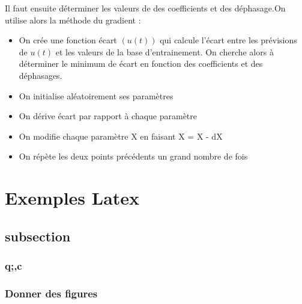 \documentclass[11pt,a4paper]{article}
\begin{document}
Il faut ensuite déterminer les valeurs de des coefficients et des déphasage.On utilise alors la méthode du gradient :
\begin{itemize}
\item On crée une fonction écart $(u(t))$ qui calcule l'écart entre les prévisions de $u(t)$ et les valeurs de la base d'entrainement. On cherche alors à déterminer le minimum de écart en fonction des coefficients et des déphasages.
\item On initialise aléatoirement ses paramètres
\item On dérive écart par rapport à chaque paramètre
\item On modifie chaque paramètre X en faisant X = X - dX
\item On répète les deux points précédents un grand nombre de fois
\end{itemize}






























\section{Exemples Latex}
\subsection{subsection}
\subsubsection{q;,c}
\subsubsection{Donner des figures}
\end{document}
